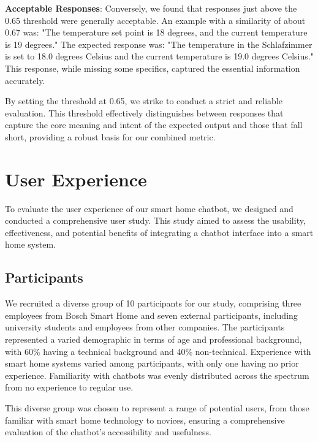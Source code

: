 \textbf{Acceptable Responses}: Conversely, we found that responses just above the 0.65 threshold were generally acceptable. An example with a similarity of about 0.67 was: "The temperature set point is 18 degrees, and the current temperature is 19 degrees." The expected response was: "The temperature in the Schlafzimmer is set to 18.0 degrees Celsius and the current temperature is 19.0 degrees Celsius." This response, while missing some specifics, captured the essential information accurately.

By setting the threshold at 0.65, we strike to conduct a strict and reliable evaluation. This threshold effectively distinguishes between responses that capture the core meaning and intent of the expected output and those that fall short, providing a robust basis for our combined metric.



\section{User Experience}

To evaluate the user experience of our smart home chatbot, we designed and conducted a comprehensive user study. This study aimed to assess the usability, effectiveness, and potential benefits of integrating a chatbot interface into a smart home system.

\subsection{Participants}
We recruited a diverse group of 10 participants for our study, comprising three employees from Bosch Smart Home and seven external participants, including university students and employees from other companies. The participants represented a varied demographic in terms of age and professional background, with 60\% having a technical background and 40\% non-technical. Experience with smart home systems varied among participants, with only one having no prior experience. Familiarity with chatbots was evenly distributed across the spectrum from no experience to regular use.

This diverse group was chosen to represent a range of potential users, from those familiar with smart home technology to novices, ensuring a comprehensive evaluation of the chatbot's accessibility and usefulness.


